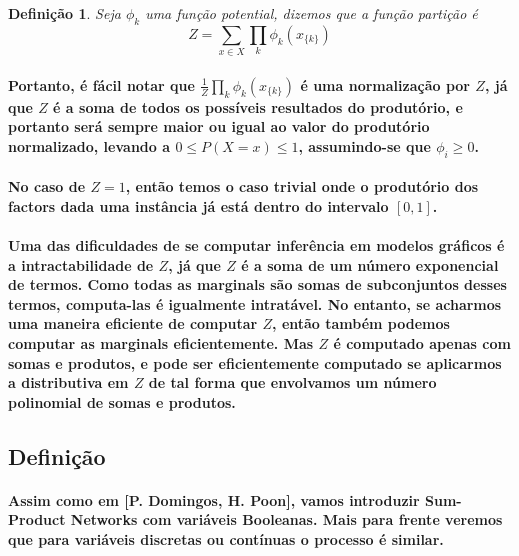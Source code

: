 \documentclass[a4paper,10pt]{article}
\theoremstyle{plain}
\newtheorem{spn-def}{Definição}
\begin{document}
\begin{spn-def} Seja $\phi_k$ uma função potential, dizemos que a função partição é
  \begin{equation}
    Z = \sum_{x \in X} \prod_k \phi_k (x_{\{k\}})
  \end{equation}
\end{spn-def}

\paragraph{
  Portanto, é fácil notar que $\frac{1}{Z} \prod_k \phi_k (x_{\{k\}})$ é uma normalização por $Z$,
  já que $Z$ é a soma de todos os possíveis resultados do produtório, e portanto será sempre maior
  ou igual ao valor do produtório normalizado, levando a $0 \leq P(X = x) \leq 1$, assumindo-se que
  $\phi_i \geq 0$.
}

\paragraph{
  No caso de $Z=1$, então temos o caso trivial onde o produtório dos factors dada uma instância já
  está dentro do intervalo $[0,1]$.
}

\paragraph{
  Uma das dificuldades de se computar inferência em modelos gráficos é a intractabilidade de $Z$,
  já que $Z$ é a soma de um número exponencial de termos. Como todas as marginals\cite{report-5}
  são somas de subconjuntos desses termos, computa-las é igualmente intratável. No entanto, se
  acharmos uma maneira eficiente de computar $Z$, então também podemos computar as marginals
  eficientemente. Mas $Z$ é computado apenas com somas e produtos, e pode ser eficientemente
  computado se aplicarmos a distributiva em $Z$ de tal forma que envolvamos um número polinomial de
  somas e produtos.
}

\subsection{Definição}

\paragraph{
  Assim como em [P. Domingos, H. Poon]\cite{poon-domingos}, vamos introduzir Sum-Product Networks
  com variáveis Booleanas. Mais para frente veremos que para variáveis discretas ou contínuas o
  processo é similar.
}
\end{document}
